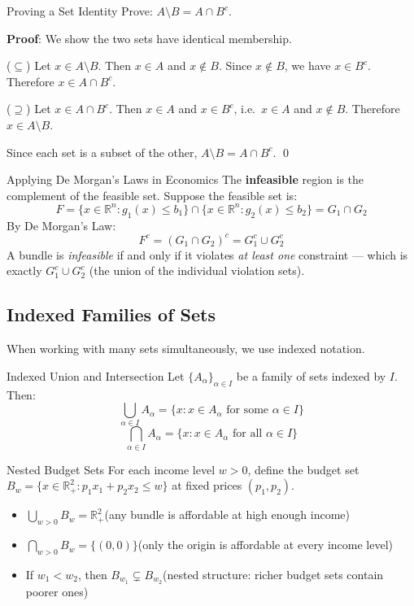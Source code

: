 \documentclass[12pt, a4paper]{article}
\theoremstyle{definition}
\newcommand{\R}{\mathbb{R}}
\begin{document}
\begin{exbox}{Proving a Set Identity}
Prove: $A \setminus B = A \cap B^c$.

\textbf{Proof}: We show the two sets have identical membership.

($\subseteq$) Let $x \in A \setminus B$. Then $x \in A$ and $x \notin B$. Since $x \notin B$, we have $x \in B^c$. Therefore $x \in A \cap B^c$.

($\supseteq$) Let $x \in A \cap B^c$. Then $x \in A$ and $x \in B^c$, i.e.\ $x \in A$ and $x \notin B$. Therefore $x \in A \setminus B$.

Since each set is a subset of the other, $A \setminus B = A \cap B^c$. \qed
\end{exbox}
\newpage
\begin{exbox}{Applying De Morgan's Laws in Economics}
The \textbf{infeasible} region is the complement of the feasible set. Suppose the feasible set is:
\[
  F = \{x \in \R^n : g_1(x) \leq b_1\} \cap \{x \in \R^n : g_2(x) \leq b_2\} = G_1 \cap G_2
\]
By De Morgan's Law:
\[
  F^c = (G_1 \cap G_2)^c = G_1^c \cup G_2^c
\]
A bundle is \textit{infeasible} if and only if it violates \textit{at least one} constraint --- which is exactly $G_1^c \cup G_2^c$ (the union of the individual violation sets).
\end{exbox}

\subsection{Indexed Families of Sets}

When working with many sets simultaneously, we use indexed notation.

\begin{defbox}{Indexed Union and Intersection}
Let $\{A_\alpha\}_{\alpha \in I}$ be a family of sets indexed by $I$. Then:
\[
  \bigcup_{\alpha \in I} A_\alpha = \{x : x \in A_\alpha \text{ for some } \alpha \in I\}
\]
\[
  \bigcap_{\alpha \in I} A_\alpha = \{x : x \in A_\alpha \text{ for all } \alpha \in I\}
\]
\end{defbox}

\begin{exbox}{Nested Budget Sets}
For each income level $w > 0$, define the budget set $B_w = \{x \in \R^2_+ : p_1 x_1 + p_2 x_2 \leq w\}$ at fixed prices $(p_1, p_2)$.

\begin{itemize}
  \item $\displaystyle\bigcup_{w > 0} B_w = \R^2_+$\quad (any bundle is affordable at high enough income)
  \item $\displaystyle\bigcap_{w > 0} B_w = \{(0,0)\}$\quad (only the origin is affordable at every income level)
  \item If $w_1 < w_2$, then $B_{w_1} \subsetneq B_{w_2}$\quad (nested structure: richer budget sets contain poorer ones)
\end{itemize}
\end{exbox}
\end{document}
